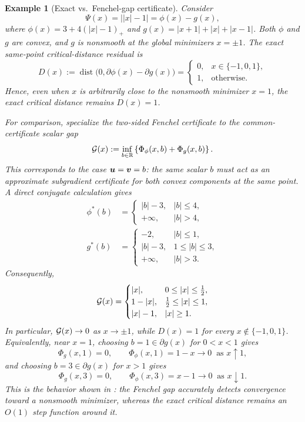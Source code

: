 \documentclass[english]{article}
\newtheorem{example}{Example}[section]
\begin{document}
\begin{example}[Exact vs.\ Fenchel-gap certificate]
\label{ex:motivating-dc-gap}
Consider
\[
    \Psi(x)=\bigl||x|-1\bigr|
    =
    \phi(x)-g(x),
\]
where \( \phi(x)=3+4(|x|-1)_+ \) and \( g(x)=|x+1|+|x|+|x-1| \). Both \(\phi\) and \(g\) are convex, and \(g\) is nonsmooth at the global minimizers \(x=\pm1\). The exact same-point critical-distance residual is
\[
    D(x)
    :=
    \operatorname{dist}\bigl(0,\partial\phi(x)-\partial g(x)\bigr)
    =
    \begin{cases}
    0, & x\in\{-1,0,1\},\\
    1, & \text{otherwise}.
    \end{cases}
\]
Hence, even when \(x\) is arbitrarily close to the nonsmooth minimizer \(x=1\), the exact critical distance remains \(D(x)=1\).

For comparison, specialize the two-sided Fenchel certificate to the common-certificate scalar gap
\[
    \mathcal{G}(x)
    :=
    \inf\limits_{b\in\mathbb{R}}
    \left\{
        \Phi_\phi(x,b)+\Phi_g(x,b)
    \right\}.
\]
This corresponds to the case \(\bm{u}=\bm{v}=b\): the same scalar \(b\) must act as an approximate subgradient certificate for both convex components at the same point. A direct conjugate calculation gives
\[
\begin{aligned}
    \phi^*(b)
    &=
    \begin{cases}
        |b|-3, & |b|\le 4,\\
        +\infty, & |b|>4,
    \end{cases}
    \\
    g^*(b)
    &=
    \begin{cases}
        -2, & |b|\le 1,\\
        |b|-3, & 1\le |b|\le 3,\\
        +\infty, & |b|>3.
    \end{cases}
\end{aligned}
\]
Consequently,
\[
    \mathcal{G}(x)
    =
    \begin{cases}
        |x|, & 0\le |x|\le \frac12,\\
        1-|x|, & \frac12\le |x|\le 1,\\
        |x|-1, & |x|\ge 1.
    \end{cases}
\]
In particular, \(\mathcal{G}(x)\to0\) as \(x\to\pm1\), while \(D(x)=1\) for every \(x\notin\{-1,0,1\}\). Equivalently, near \(x=1\), choosing \(b=1\in\partial g(x)\) for \(0<x<1\) gives
\[
    \Phi_g(x,1)=0,
    \qquad
    \Phi_\phi(x,1)=1-x\to0
    \;\;\text{as }x\uparrow1,
\]
and choosing \(b=3\in\partial g(x)\) for \(x>1\) gives
\[
    \Phi_g(x,3)=0,
    \qquad
    \Phi_\phi(x,3)=x-1\to0
    \;\;\text{as }x\downarrow1.
\]
This is the behavior shown in : the Fenchel gap accurately detects convergence toward a nonsmooth minimizer, whereas the exact critical distance remains an \(O(1)\) step function around it.
\end{example}
\end{document}
